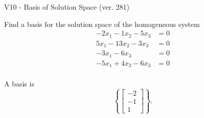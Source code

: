 \begin{exercise}
  \begin{exerciseTitle}V10 - Basis of Solution Space (ver. 281)\end{exerciseTitle}
  \begin{exerciseStatement}
    Find a basis for the solution space of the homogeneous system 
\begin{align*}
 -2 x_ 1 -1 x_ 2 -5 x_ 3 &= 0  \\ 
  5 x_ 1 -13 x_ 2 -3 x_ 3 &= 0  \\ 
  -3 x_ 1 -6 x_ 3 &= 0  \\ 
  -5 x_ 1 + 4 x_ 2 -6 x_ 3 &= 0  \\ 
 \end{align*}


 
  \end{exerciseStatement}

  \begin{exerciseAnswer}
   A basis is   
\[\left\{\left[\begin{array}{c}
-2 \\
-1 \\
1
\end{array}\right]\right\}.\]

  


  \end{exerciseAnswer}
\end{exercise}